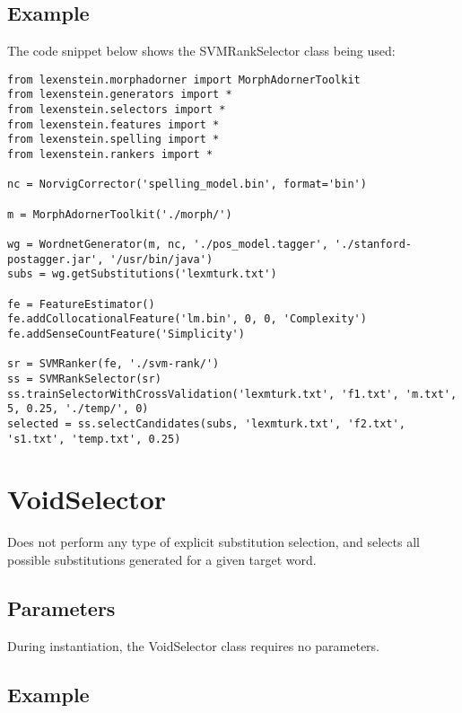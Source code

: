 \subsection{Example}

The code snippet below shows the SVMRankSelector class being used:

\begin{lstlisting}
from lexenstein.morphadorner import MorphAdornerToolkit
from lexenstein.generators import *
from lexenstein.selectors import *
from lexenstein.features import *
from lexenstein.spelling import *
from lexenstein.rankers import *

nc = NorvigCorrector('spelling_model.bin', format='bin')

m = MorphAdornerToolkit('./morph/')

wg = WordnetGenerator(m, nc, './pos_model.tagger', './stanford-postagger.jar', '/usr/bin/java')
subs = wg.getSubstitutions('lexmturk.txt')

fe = FeatureEstimator()
fe.addCollocationalFeature('lm.bin', 0, 0, 'Complexity')
fe.addSenseCountFeature('Simplicity')

sr = SVMRanker(fe, './svm-rank/')
ss = SVMRankSelector(sr)
ss.trainSelectorWithCrossValidation('lexmturk.txt', 'f1.txt', 'm.txt', 5, 0.25, './temp/', 0)
selected = ss.selectCandidates(subs, 'lexmturk.txt', 'f2.txt', 's1.txt', 'temp.txt', 0.25)
\end{lstlisting}










\section{VoidSelector}

Does not perform any type of explicit substitution selection, and selects all possible substitutions generated for a given target word.

\subsection{Parameters}

During instantiation, the VoidSelector class requires no parameters.

\subsection{Example}

